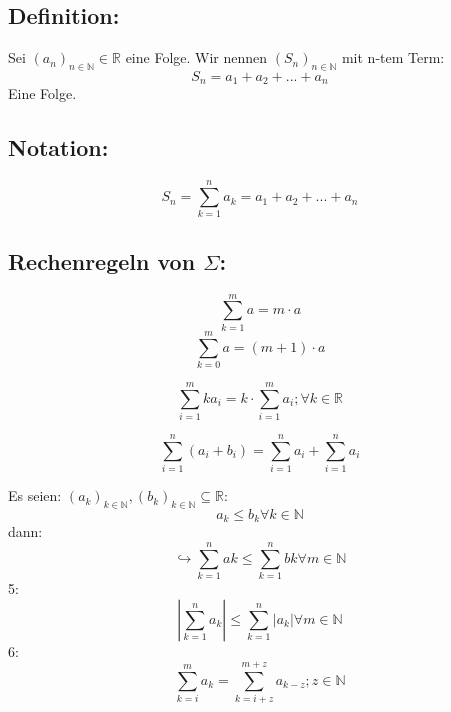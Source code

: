\subsection{Definition:}
Sei $(a_n)_{n∈ℕ}∈ℝ$ eine Folge. Wir nennen $(S_n)_{n∈ℕ}$ mit n-tem Term: $$S_n = a_1 +a_2 + ... + a_n$$ Eine Folge.
\subsection{Notation:}
$$S_n=\sum_{k=1}^n a_k=a_1 +a_2 + ... + a_n$$
\subsection{Rechenregeln von $\Sigma$:}

$$\sum_{k=1}^m a=m ⋅ a$$
$$\sum_{k=0}^m a=(m+1) ⋅ a$$

$$\sum_{i=1}^m ka_i=k ⋅ \sum_{i=1}^m a_i ; ∀ k ∈ ℝ$$

$$\sum_{i=1}^n (a_i+b_i) = \sum_{i=1}^n a_i + \sum_{i=1}^n a_i$$

Es seien: $(a_k)_{k∈ℕ} , (b_k)_{k∈ℕ}⊆ℝ$:
$$a_k≤b_k ∀ k∈ℕ$$
dann:
$$↪\sum_{k=1}^n ak ≤ \sum_{k=1}^n bk ∀m∈ℕ$$
5:
$$\left|\sum_{k=1}^n a_k\right| ≤ \sum_{k=1}^n \left| a_k \right|∀m∈ℕ$$
6:
$$\sum_{k=i}^m a_k=\sum_{k=i+z}^{m+z} a_{k-z}; z∈ℕ$$
